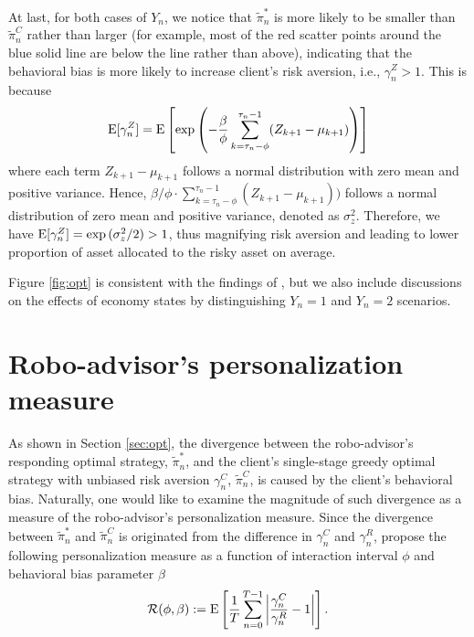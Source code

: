 At last, for both cases of $Y_n$, we notice that $\tilde\pi_n^*$ is more likely to be smaller than $\tilde \pi_n^C$ rather than larger (for example, most of the red scatter points around the blue solid line are below the line rather than above), indicating that the behavioral bias is more likely to increase client's risk aversion, i.e., $\gamma_n^Z>1$. This is because $$\mathrm{E}[\gamma_n^Z]=\mathrm{E}\left[\exp\left(-\frac{\beta}{\phi}\sum_{k=\tau_n-\phi}^{\tau_n-1}(Z_{k+1}-\mu_{k+1})\right)\right]$$ where each term $Z_{k+1}-\mu_{k+1}$ follows a normal distribution with zero mean and positive variance. Hence, ${\beta}/{\phi}\cdot \sum_{k=\tau_n-\phi}^{\tau_n-1}(Z_{k+1}-\mu_{k+1}))$ follows a normal distribution of zero mean and positive variance, denoted as $\sigma_z^2$. Therefore, we have $\mathrm{E}[\gamma_n^Z]=\exp{(\sigma_z^2/2)}>1$, thus magnifying risk aversion and leading to lower proportion of asset allocated to the risky asset on average.

Figure \ref{fig:opt} is consistent with the findings of , but we also include discussions on the effects of economy states by distinguishing $Y_n=1$ and $Y_n=2$ scenarios.

\section{Robo-advisor's personalization measure}\label{sec:personalize}
As shown in Section \ref{sec:opt}, the divergence between the robo-advisor's responding optimal strategy, $\tilde\pi_n^*$, and the client's single-stage greedy optimal strategy with unbiased risk aversion $\gamma_n^C$, $\tilde\pi_n^C$, is caused by the client's behavioral bias. Naturally, one would like to examine the magnitude of such divergence as a measure of the robo-advisor's personalization measure. Since the divergence between $\tilde\pi_n^*$ and $\tilde\pi_n^C$ is originated from the difference in $\gamma_n^C$ and $\gamma_n^R$,  propose the following personalization measure as a function of interaction interval $\phi$ and behavioral bias parameter $\beta$\begin{equation}
    \mathcal R(\phi,\beta):=\mathrm{E}\left[\frac1T\sum_{n=0}^{T-1}\left|\frac{\gamma_n^C}{\gamma_n^R}-1\right|\right].
\end{equation}

